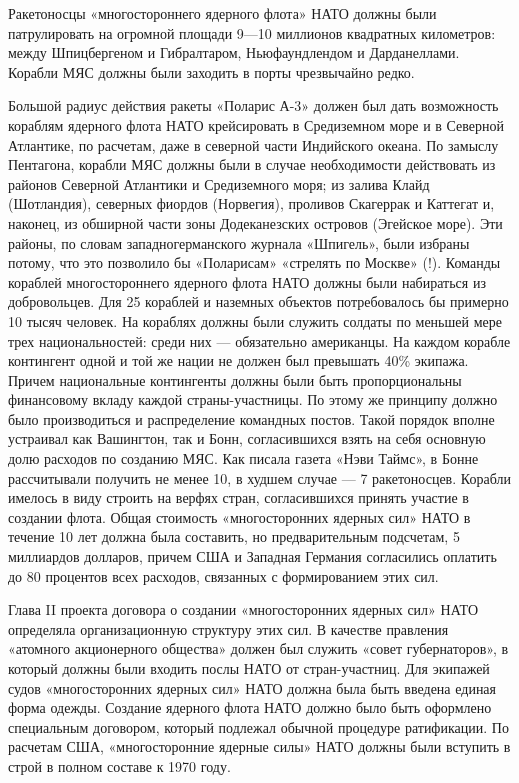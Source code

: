 \documentclass[12pt, a4paper, openany]{book}
\begin{document}
	
	
	Ракетоносцы «многостороннего ядерного флота» НАТО должны были патрулировать на огромной площади 9—10 миллионов квадратных километров: между Шпицбергеном и Гибралтаром, Ньюфаундлендом и Дарданеллами. Корабли МЯС должны были заходить в порты чрезвычайно редко.
	
	Большой радиус действия ракеты «Поларис А-3» должен был дать возможность кораблям ядерного флота НАТО крейсировать в Средиземном море и в Северной Атлантике, по расчетам, даже в северной части Индийского океана. По замыслу Пентагона, корабли МЯС должны были в случае необходимости действовать из районов Северной Атлантики и Средиземного моря; из залива Клайд (Шотландия), северных фиордов (Норвегия), проливов Скагеррак и Каттегат и, наконец, из обширной части зоны Додеканезских островов (Эгейское море). Эти районы, по словам западногерманского журнала «Шпигель», были избраны потому, что это позволило бы «Поларисам» «стрелять по Москве» (!). Команды кораблей многостороннего ядерного флота НАТО должны были набираться из добровольцев. Для 25 кораблей и наземных объектов потребовалось бы примерно 10 тысяч человек. На кораблях должны были служить солдаты по меньшей мере трех национальностей: среди них — обязательно американцы. На каждом корабле контингент одной и той же нации не должен был превышать 40\% экипажа. Причем национальные контингенты должны были быть пропорциональны финансовому вкладу каждой страны-участницы. По этому же принципу должно было производиться и распределение командных постов. Такой порядок вполне устраивал как Вашингтон, так и Бонн, согласившихся взять на себя основную долю расходов по созданию МЯС. Как писала газета «Нэви Таймс», в Бонне рассчитывали получить не менее 10, в худшем случае — 7 ракетоносцев. Корабли имелось в виду строить на верфях стран, согласившихся принять участие в создании флота. Общая стоимость «многосторонних ядерных сил» НАТО в течение 10 лет должна была составить, но предварительным подсчетам, 5 миллиардов долларов, причем США и Западная Германия согласились оплатить до 80 процентов всех расходов, связанных с формированием этих сил.
	
	Глава II проекта договора о создании «многосторонних ядерных сил» НАТО определяла организационную структуру этих сил. В качестве правления «атомного акционерного общества» должен был служить «совет губернаторов», в который должны были входить послы НАТО от стран-участниц. Для экипажей судов «многосторонних ядерных сил» НАТО должна была быть введена единая форма одежды. Создание ядерного флота НАТО должно было быть оформлено специальным договором, который подлежал обычной процедуре ратификации. По расчетам США, «многосторонние ядерные силы» НАТО должны были вступить в строй в полном составе к 1970 году.
	
\end{document}

